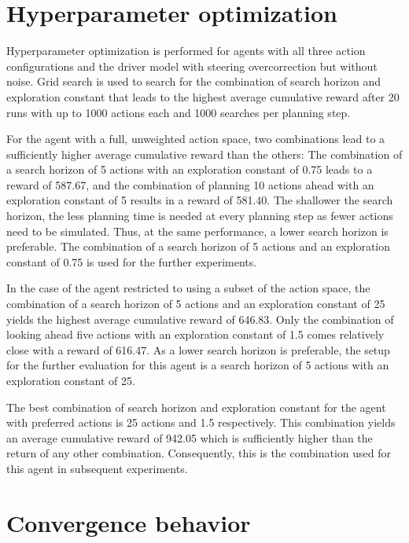 

\section{Hyperparameter optimization}

Hyperparameter optimization is performed for agents with all three action configurations and the driver model with steering overcorrection but without noise. Grid search is used to search for the combination of search horizon and exploration constant that leads to the highest average cumulative reward after 20 runs with up to 1000 actions each and 1000 searches per planning step.



For the agent with a full, unweighted action space, two combinations lead to a sufficiently higher average cumulative reward than the others: The combination of a search horizon of 5 actions with an exploration constant of 0.75 leads to a reward of 587.67, and the combination of planning 10 actions ahead with an exploration constant of 5 results in a reward of 581.40. The shallower the search horizon, the less planning time is needed at every planning step as fewer actions need to be simulated. Thus, at the same performance, a lower search horizon is preferable. The combination of a search horizon of 5 actions and an exploration constant of 0.75 is used for the further experiments.

In the case of the agent restricted to using a subset of the action space, the combination of a search horizon of 5 actions and an exploration constant of 25 yields the highest average cumulative reward of 646.83. Only the combination of looking ahead five actions with an exploration constant of 1.5 comes relatively close with a reward of 616.47. As a lower search horizon is preferable, the setup for the further evaluation for this agent is a search horizon of 5 actions with an exploration constant of 25. 

The best combination of search horizon and exploration constant for the agent with preferred actions is 25 actions and 1.5 respectively. This combination yields an average cumulative reward of 942.05 which is sufficiently higher than the return of any other combination. Consequently, this is the combination used for this agent in subsequent experiments.

\section{Convergence behavior}

